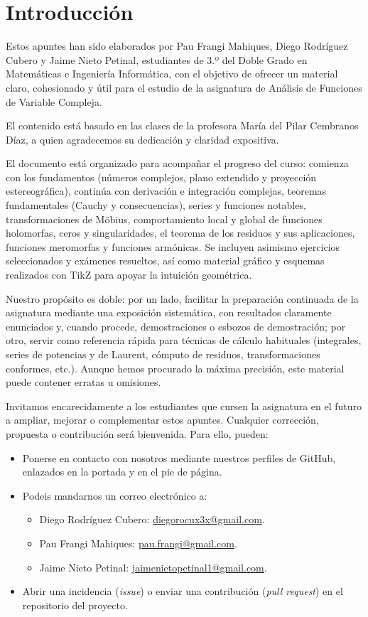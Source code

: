 \section*{Introducción}

Estos apuntes han sido elaborados por Pau Frangi Mahiques, Diego Rodríguez Cubero y Jaime Nieto Petinal, estudiantes de 3.º del Doble Grado en Matemáticas e Ingeniería Informática, con el objetivo de ofrecer un material claro, cohesionado y útil para el estudio de la asignatura de Análisis de Funciones de Variable Compleja.

El contenido está basado en las clases de la profesora María del Pilar Cembranos Díaz, a quien agradecemos su dedicación y claridad expositiva.

El documento está organizado para acompañar el progreso del curso: comienza con los fundamentos (números complejos, plano extendido y proyección estereográfica), continúa con derivación e integración complejas, teoremas fundamentales (Cauchy y consecuencias), series y funciones notables, transformaciones de Möbius, comportamiento local y global de funciones holomorfas, ceros y singularidades, el teorema de los residuos y sus aplicaciones, funciones meromorfas y funciones armónicas. Se incluyen asimismo ejercicios seleccionados y exámenes resueltos, así como material gráfico y esquemas realizados con TikZ para apoyar la intuición geométrica.

Nuestro propósito es doble: por un lado, facilitar la preparación continuada de la asignatura mediante una exposición sistemática, con resultados claramente enunciados y, cuando procede, demostraciones o esbozos de demostración; por otro, servir como referencia rápida para técnicas de cálculo habituales (integrales, series de potencias y de Laurent, cómputo de residuos, transformaciones conformes, etc.). Aunque hemos procurado la máxima precisión, este material puede contener erratas u omisiones.

Invitamos encarecidamente a los estudiantes que cursen la asignatura en el futuro a ampliar, mejorar o complementar estos apuntes. Cualquier corrección, propuesta o contribución será bienvenida. Para ello, pueden:
\begin{itemize}
	\item Ponerse en contacto con nosotros mediante nuestros perfiles de GitHub, enlazados en la portada y en el pie de página.
	\item Podeis mandarnos un correo electrónico a:
	\begin{itemize}
        \item Diego Rodríguez Cubero: \href{mailto:diegorocux3x@gmail.com}{diegorocux3x@gmail.com}.
        \item Pau Frangi Mahiques: \href{mailto:pau.frangi@gmail.com}{pau.frangi@gmail.com}.
        \item Jaime Nieto Petinal: \href{mailto:jaimenietopetinal1@gmail.com}{jaimenietopetinal1@gmail.com}.
    \end{itemize}
    \item Abrir una incidencia (\emph{issue}) o enviar una contribución (\emph{pull request}) en el repositorio del proyecto.
\end{itemize}

